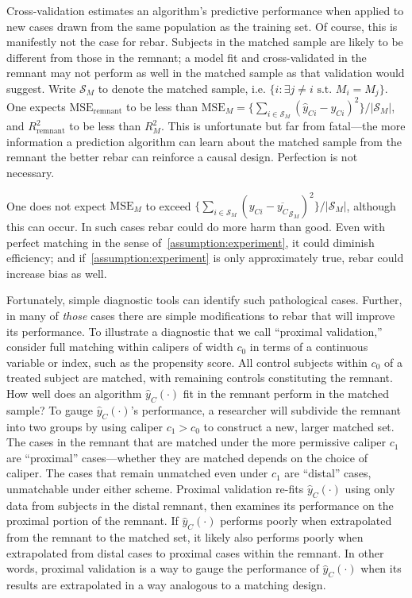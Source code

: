 \documentclass[12pt]{article}\usepackage[]{graphicx}\usepackage[]{color}
\newcommand{\Match}{M}
\newcommand{\algorithm}{\hat{y}_C(\cdot)}
\begin{document}
Cross-validation estimates an algorithm's predictive performance when
applied to new cases drawn from the same population as the training
set.
Of course, this is manifestly not the case for rebar.
Subjects in the matched sample are likely to be different from those
in the remnant; a model fit and cross-validated in the remnant may not perform as well in
the matched sample as that validation would suggest.
Write $\mathcal{S}_{\Match}$ to denote the matched sample, i.e. $\{i :
\exists j \neq i \text{ s.t. } M_{i} = M_{j}\}$. One expects $\mathrm{MSE}_\mathrm{remnant}$ to be less than
$\mathrm{MSE}_{\Match}=\{\sum_{i \in \mathcal{S}_{\Match}}
(\hat{y}_{Ci}-y_{Ci})^2\}/|\mathcal{S}_{\Match}|$, and  $R^2_\mathrm{remnant}$
to be less than $R^2_{\Match}$.
This is unfortunate but far from fatal---the more information a
prediction algorithm can learn about the matched sample from the
remnant the better rebar can reinforce a causal design.
Perfection is not necessary.

One does not expect $\mathrm{MSE}_{\Match}$ to exceed $\{\sum_{i \in \mathcal{S}_{\Match}}
(y_{Ci} -\overline{{y}_{C}}_{\mathcal{S}_{\Match}})^2\}/|\mathcal{S}_{\Match}|$,
although this can occur.
In such cases rebar could do more harm than good. Even with perfect
matching in the sense of~\eqref{assumption:experiment}, it could
diminish efficiency; and if~\eqref{assumption:experiment} is only
approximately true, rebar could increase bias as well.

Fortunately, simple diagnostic tools can identify such pathological cases.
Further, in many of \emph{those} cases there are simple modifications
to rebar that will improve its performance.
To illustrate a diagnostic that we call ``proximal validation,''
consider full matching within calipers of width $c_0$ in terms of a
continuous variable or index, such as the propensity score.
All control subjects within $c_0$ of a treated
subject are matched, with remaining controls constituting the remnant.
How well does an algorithm $\algorithm$ fit in the remnant perform in the matched sample?
To gauge $\algorithm$'s performance, a researcher will subdivide the remnant into two groups by using caliper $c_1>c_0$ to construct a new, larger matched set.
The cases in the remnant that are matched under the more permissive caliper $c_1$ are ``proximal'' cases---whether they are matched depends on the choice of caliper.
The cases that remain unmatched even under $c_1$ are ``distal'' cases, unmatchable under either scheme.
Proximal validation re-fits $\algorithm$ using only data from
subjects in the distal remnant, then examines its performance on the proximal portion of the remnant.
If $\algorithm$ performs poorly when extrapolated from the remnant to the matched set, it likely also performs poorly when extrapolated from distal cases to proximal cases within the remnant.
In other words, proximal validation is a way to gauge the performance of $\algorithm$ when its results are extrapolated in a way analogous to a matching design.
\end{document}

